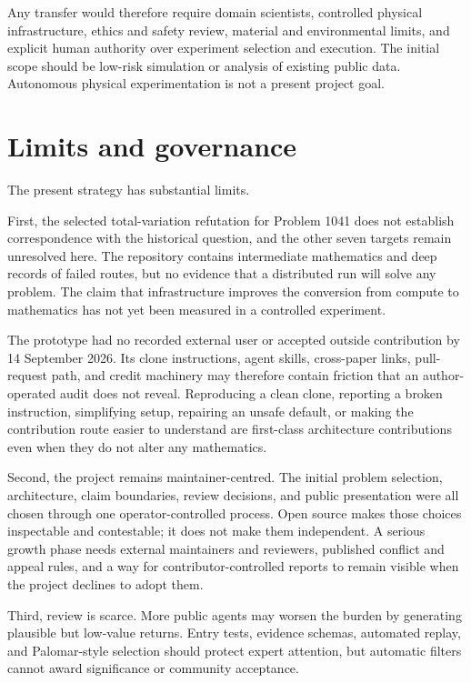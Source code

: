 \documentclass[10pt]{article}
\begin{document}
Any transfer would therefore require domain scientists, controlled physical
infrastructure, ethics and safety review, material and environmental limits,
and explicit human authority over experiment selection and execution.  The
initial scope should be low-risk simulation or analysis of existing public
data.  Autonomous physical experimentation is not a present project goal.

\section{Limits and governance}\label{sec:limits}

The present strategy has substantial limits.

First, the selected total-variation refutation for Problem 1041 does not
establish correspondence with the historical question, and the other seven
targets remain unresolved here. The repository contains intermediate
mathematics and deep records of failed routes, but no evidence
that a distributed run will solve any problem.  The claim that infrastructure
improves the conversion from compute to mathematics has not yet been measured
in a controlled experiment.

The prototype had no recorded external user or accepted outside contribution
by 14 September 2026. Its clone instructions, agent skills, cross-paper links,
pull-request path, and credit machinery may therefore contain friction that an
author-operated audit does not reveal. Reproducing a clean clone, reporting a
broken instruction, simplifying setup, repairing an unsafe default, or making
the contribution route easier to understand are first-class architecture
contributions even when they do not alter any mathematics.

Second, the project remains maintainer-centred.  The initial problem
selection, architecture, claim boundaries, review decisions, and public
presentation were all chosen through one operator-controlled process.  Open
source makes those choices inspectable and contestable; it does not make them
independent.  A serious growth phase needs external maintainers and reviewers,
published conflict and appeal rules, and a way for contributor-controlled
reports to remain visible when the project declines to adopt them.

Third, review is scarce.  More public agents may worsen the burden by
generating plausible but low-value returns.  Entry tests, evidence schemas,
automated replay, and Palomar-style selection should protect expert attention,
but automatic filters cannot award significance or community acceptance.
\end{document}
